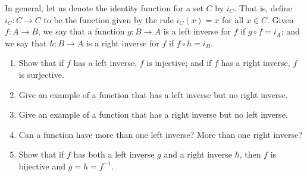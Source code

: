 \begin{exercise}\label{chapter1:section2:exercise5}
    In general, let us denote the identity function for a set $C$ by $i_{C}$. That is, define $i_{C}: C \to C$ to be the function given by the rule $i_{C}(x) = x$ for all $x \in C$. Given $f: A \to B$, we say that a function $g: B \to A$ is a left inverse for $f$ if $g\circ f = i_{A}$; and we say that $h: B \to A$ is a right inverse for $f$ if $f\circ h = i_{B}$.
    \begin{enumerate}[label={(\alph*)}]
        \item Show that if $f$ has a left inverse, $f$ is injective; and if $f$ has a right inverse, $f$ is surjective.
        \item Give an example of a function that has a left inverse but no right inverse.
        \item Give an example of a function that has a right inverse but no left inverse.
        \item Can a function have more than one left inverse? More than one right inverse?
        \item Show that if $f$ has both a left inverse $g$ and a right inverse $h$, then $f$ is bijective and $g = h = f^{-1}$.
    \end{enumerate}
\end{exercise}

